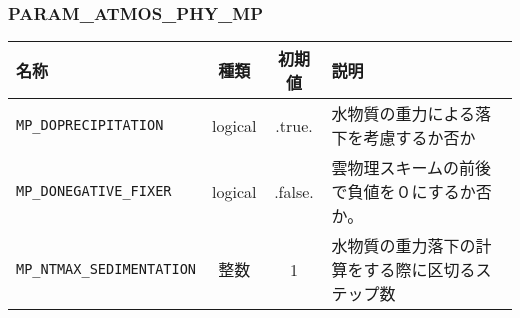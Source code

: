 \subsubsection{PARAM\_ATMOS\_PHY\_MP}
\begin{tabularx}{150mm}{|l|c|c|X|} \hline
 \rowcolor[gray]{0.9} 名称 & 種類 & 初期値 & 説明 \\ \hline
 \verb|MP_DOPRECIPITATION| & logical & .true. & 水物質の重力による落下を考慮するか否か \\ \hline
 \verb|MP_DONEGATIVE_FIXER| & logical & .false. & 雲物理スキームの前後で負値を０にするか否か。 \\ \hline
 \verb|MP_NTMAX_SEDIMENTATION| & 整数 & 1 & 水物質の重力落下の計算をする際に区切るステップ数 \\ \hline
\end{tabularx}




